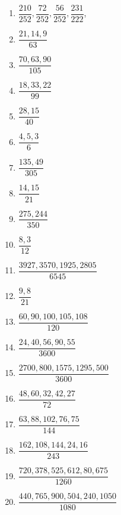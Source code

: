 \begin{multicols}{2}
\begin{enumerate}[$(1)$]
\item
     $\dfrac{210}{252}, \dfrac{72}{252}, \dfrac{56}{252}, \dfrac{231}{222}$,  
\item $\dfrac{21, 14, 9}{63}$
\item $\dfrac{70, 63, 90}{105}$ 
\item $\dfrac{18, 33, 22}{99}$
\item $\dfrac{28, 15}{40}$
\item $\dfrac{4, 5, 3}{6}$
\item $\dfrac{135, 49}{305}$ 
\item $\dfrac{14, 15}{21}$
\item $\dfrac{275, 244}{350}$
\item $\dfrac{8, 3}{12}$
\item $\dfrac{3927, 3570, 1925, 2805}{6545}$
\item $\dfrac{9,8}{21}$
\item $\dfrac{60, 90, 100, 105, 108}{120}$
\item $\dfrac{24, 40, 56,90, 55}{3600}$
\item $\dfrac{2700, 800, 1575, 1295, 500}{3600}$
\item $\dfrac{48, 60, 32, 42, 27}{72}$
\item $\dfrac{63, 88, 102, 76, 75}{144}$
\item $\dfrac{162, 108, 144, 24, 16}{243}$
\item $\dfrac{720, 378, 525, 612, 80, 675}{1260}$
\item $\dfrac{440, 765, 900, 504, 240, 1050}{1080}$ 
\end{enumerate}
\end{multicols}


